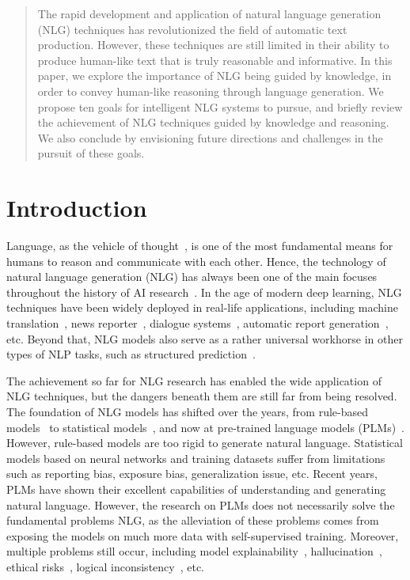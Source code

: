 
\begin{abstract}
    The rapid development and application of natural language generation (NLG) techniques has revolutionized the field of automatic text production. However, these techniques are still limited in their ability to produce human-like text that is truly reasonable and informative. In this paper, we explore the importance of NLG being guided by knowledge, in order to convey human-like reasoning through language generation. We propose ten goals for intelligent NLG systems to pursue, and briefly review the achievement of NLG techniques guided by knowledge and reasoning. We also conclude by envisioning future directions and challenges in the pursuit of these goals.
\end{abstract}


\section{Introduction}
\label{sec:intro}


Language, as the vehicle of thought~\cite{wittgenstein1958blue}, is one of the most fundamental means for humans to reason and communicate with each other.
Hence, the technology of natural language generation (NLG) has always been one of the main focuses throughout the history of AI research~\cite{weizenbaum1966eliza}.
In the age of modern deep learning, NLG techniques have been widely deployed in real-life applications, including machine translation~\cite{wu2016google}, news reporter~\cite{xu-etal-2020-xiaomingbot}, dialogue systems~\cite{thoppilan2022lamda}, automatic report generation~\cite{gkatzia-et-al-2017}, etc.
Beyond that, NLG models also serve as a rather universal workhorse in other types of NLP tasks, such as structured prediction~\cite{paolini2021structured}.


The achievement so far for NLG research has enabled the wide application of NLG techniques, but the dangers beneath them are still far from being resolved.
The foundation of NLG models has shifted over the years, from rule-based models~\cite{kukich-1983-design,mckeown1992text} to statistical models~\cite{vaswani2017attention}, and now at pre-trained language models (PLMs)~\cite{radford2019language,devlin-etal-2019-bert,raffel2020exploring,lewis-etal-2020-bart,NEURIPS2020_1457c0d6}.
However, rule-based models are too rigid to generate natural language.
Statistical models based on neural networks and training datasets suffer from limitations such as reporting bias, exposure bias, generalization issue, etc.
Recent years, PLMs have shown their excellent capabilities of understanding and generating natural language.
However, the research on PLMs does not necessarily solve the fundamental problems NLG, as the alleviation of these problems comes from exposing the models on much more data with self-supervised training.
Moreover, multiple problems still occur, including model explainability~\cite{liu-etal-2021-explainaboard}, hallucination~\cite{raunak-etal-2021-curious,xiao-wang-2021-hallucination}, ethical risks~\cite{vanderlyn-etal-2021-seemed,ziems-etal-2022-moral}, logical inconsistency~\cite{kim-etal-2020-will,elazar-etal-2021-measuring}, etc.

